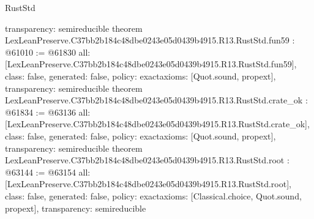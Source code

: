 \begin{lexlean}{RustStd}
\begin{coremodule}
{  transparency: semireducible
}
theorem LexLeanPreserve.C37bb2b184c48dbe0243e05d0439b4915.R13.RustStd.fun59 : @61010 := @61830 {
  all: [LexLeanPreserve.C37bb2b184c48dbe0243e05d0439b4915.R13.RustStd.fun59],
  class: false,
  generated: false,
  policy: exact{axioms: [Quot.sound, propext]},
  transparency: semireducible
}
theorem LexLeanPreserve.C37bb2b184c48dbe0243e05d0439b4915.R13.RustStd.crate_ok : @61834 := @63136 {
  all: [LexLeanPreserve.C37bb2b184c48dbe0243e05d0439b4915.R13.RustStd.crate_ok],
  class: false,
  generated: false,
  policy: exact{axioms: [Quot.sound, propext]},
  transparency: semireducible
}
theorem LexLeanPreserve.C37bb2b184c48dbe0243e05d0439b4915.R13.RustStd.root : @63144 := @63154 {
  all: [LexLeanPreserve.C37bb2b184c48dbe0243e05d0439b4915.R13.RustStd.root],
  class: false,
  generated: false,
  policy: exact{axioms: [Classical.choice, Quot.sound, propext]},
  transparency: semireducible
}


\end{coremodule}
\end{lexlean}
